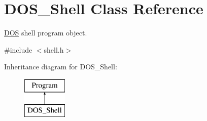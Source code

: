 \hypertarget{classDOS__Shell}{\section{D\-O\-S\-\_\-\-Shell Class Reference}
\label{classDOS__Shell}
}


\hyperlink{classDOS}{D\-O\-S} shell program object.  




{\ttfamily \#include $<$shell.\-h$>$}

Inheritance diagram for D\-O\-S\-\_\-\-Shell\-:\begin{figure}[H]
\begin{center}
\leavevmode
\includegraphics[height=2.000000cm]{classDOS__Shell}
\end{center}
\end{figure}
